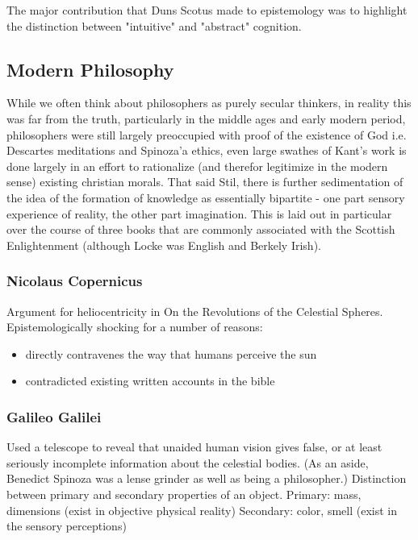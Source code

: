 \documentclass[11pt]{article}
\begin{document}
The major contribution that Duns Scotus made to epistemology 
was to highlight the distinction between "intuitive" and "abstract"
cognition.


\subsection{Modern Philosophy}
\label{sec:org5afcb6e}
While we often think about philosophers as purely secular thinkers,
in reality this was far from the truth, particularly in the middle
ages and early modern period, philosophers were still largely preoccupied 
with proof of the existence of God i.e. Descartes meditations and Spinoza'a 
ethics, even large swathes of Kant's work is done largely in an effort 
to rationalize (and therefor legitimize in the modern sense) existing 
christian morals. 
That said Stil, there is further sedimentation of the idea of the 
formation of knowledge as essentially bipartite - one part sensory 
experience of reality, the other part imagination. This is laid out in 
particular over the course of three books that are commonly associated 
with the Scottish Enlightenment (although Locke was English and Berkely Irish).

\subsubsection{Nicolaus Copernicus}
\label{sec:orgf32fee0}
Argument for heliocentricity in On the Revolutions of the Celestial Spheres.
Epistemologically shocking for a number of reasons:
\begin{itemize}
\item directly contravenes the way that humans perceive the sun
\item contradicted existing written accounts in the bible
\end{itemize}

\subsubsection{Galileo Galilei}
\label{sec:orgf255760}
Used a telescope to reveal that unaided human vision gives false, or
at least seriously incomplete information about the celestial bodies. 
(As an aside, Benedict Spinoza was a lense grinder as well as being
a philosopher.)
Distinction between primary and secondary properties of an object. 
Primary: mass, dimensions (exist in objective physical reality)
Secondary: color, smell (exist in the sensory perceptions)
\end{document}
